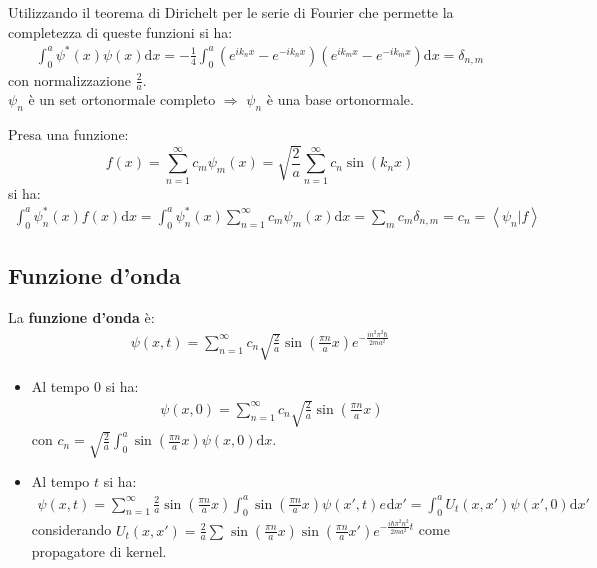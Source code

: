 Utilizzando il teorema di Dirichelt per le serie di Fourier che permette la completezza di queste funzioni si ha:
\begin{equation}\begin{split}
\int_{0}^{a}{\psi ^*(x)\psi(x)  \textrm{d}x}=-\frac{1}{4}\int_{0}^{a}{\left(e^{ik_nx}-e^{-ik_nx}\right)\left(e^{ik_mx}-e^{-ik_mx}\right) \textrm{d}x}=\delta _{n,m}
\end{split}\end{equation}
con normalizzazione $\frac{2}{a}$.
\\ $\psi_n$ è un set ortonormale completo $\Longrightarrow$ $\psi_n$ è una base ortonormale.

Presa una funzione:
\[
f\left(x\right)=\sum_{n=1}^{\infty}c_m\psi_m \left(x\right)=\sqrt{\frac{2}{a}}\sum_{n=1}^{\infty }c_n\sin{\left(k_nx\right)}
\]
si ha:
\begin{equation}\begin{split}
\int_{0}^{a}{\psi_n ^*(x)f\left(x\right) \textrm{d}x}=\int_{0}^{a}{\psi_n ^*(x)\sum_{n=1}^{\infty}c_m\psi_m \left(x\right)\textrm{d}x}=\sum_{m}c_m\delta_{n,m}=c_n=\left \langle\psi _n | f \right\rangle
\end{split}\end{equation}

\subsection{Funzione d'onda} %
La \textbf{funzione d'onda} è:
\begin{equation}\begin{split}
\psi \left(x,t\right)=\sum_{n=1}^{\infty }c_n\sqrt{\frac{2}{a}}\sin{\left(\frac{\pi n}{a}x\right)e^{-\frac{in^2 \pi ^2\hbar}{2ma^2}}}
\end{split}\end{equation}
\begin{itemize}
\item Al tempo $0$ si ha:
\begin{equation}\begin{split}
\psi \left(x,0\right)=\sum_{n=1}^{\infty }c_n\sqrt{\frac{2}{a}}\sin{\left(\frac{\pi n}{a}x\right)}
\end{split}\end{equation}
con $c_n=\sqrt{\frac{2}{a}}\int_{0}^{a}{\sin{\left(\frac{\pi n}{a}x\right)}\psi \left(x,0\right) \textrm{d}x}$.
\item Al tempo $t$ si ha:
\begin{equation}\begin{split}
\psi \left(x,t\right)=\sum_{n=1}^{\infty }\frac{2}{a}\sin{\left(\frac{\pi n}{a}x\right)}\int_{0}^{a}{\sin{\left(\frac{\pi n}{a}x\right)}\psi \left(x',t\right)e^{} \textrm{d}x'}=\int_{0}^{a}{U_t\left(x,x'\right)\psi \left(x',0\right) \textrm{d}x'}
\end{split}\end{equation}
considerando ${U_t\left(x,x'\right)}=\frac{2}{a}\sum_{}^{}\sin{\left(\frac{\pi n}{a}x\right)}\sin{\left(\frac{\pi n}{a}x'\right)}e^{-\frac{i\hbar \pi^2n^2}{2ma^2}t}$ come propagatore di kernel.
\end{itemize}

